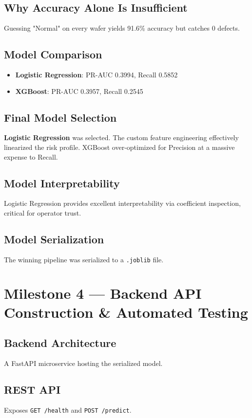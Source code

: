 \documentclass[12pt, a4paper]{article}
\begin{document}
\subsection{Why Accuracy Alone Is Insufficient}
Guessing "Normal" on every wafer yields 91.6\% accuracy but catches 0 defects. 

\subsection{Model Comparison}
\begin{itemize}
    \item \textbf{Logistic Regression}: PR-AUC 0.3994, Recall 0.5852
    \item \textbf{XGBoost}: PR-AUC 0.3957, Recall 0.2545
\end{itemize}

\subsection{Final Model Selection}
\textbf{Logistic Regression} was selected. The custom feature engineering effectively linearized the risk profile. XGBoost over-optimized for Precision at a massive expense to Recall.

\subsection{Model Interpretability}
Logistic Regression provides excellent interpretability via coefficient inspection, critical for operator trust.

\subsection{Model Serialization}
The winning pipeline was serialized to a \texttt{.joblib} file.

\section{Milestone 4 — Backend API Construction \& Automated Testing}
\subsection{Backend Architecture}
A FastAPI microservice hosting the serialized model.

\subsection{REST API}
Exposes \texttt{GET /health} and \texttt{POST /predict}.
\end{document}
